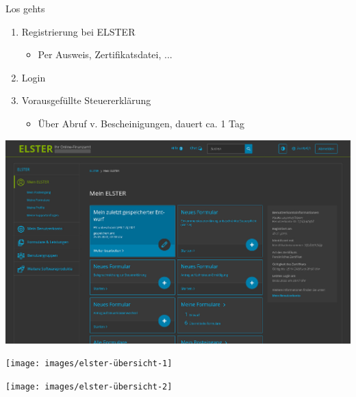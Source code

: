 \documentclass{beamer}
\begin{document}
			\begin{frame}{Los gehts}
				\begin{enumerate}
					\item Registrierung bei ELSTER
					\begin{itemize}
						\item Per Ausweis, Zertifikatsdatei, ...
					\end{itemize}\pause
					\item Login\pause
					\item Vorausgefüllte Steuererklärung
					\begin{itemize}
						\item Über Abruf v. Bescheinigungen, dauert ca. 1 Tag
					\end{itemize}
				\end{enumerate}
			\end{frame}
		
			\begin{frame}
				\begin{center}
					\vspace{-0.6cm}
					\hspace*{-0.91cm}
					\includegraphics[scale=0.24]{images/elster-1}
				\end{center}
			\end{frame}
		
			\begin{frame}
				\begin{center}
					\vspace{-0.6cm}
					\hspace*{-0.91cm}
					\texttt{[image: images/elster-übersicht-1]}
				\end{center}
			\end{frame}
		
			\begin{frame}
				\begin{center}
					\vspace{-0.6cm}
					\hspace*{-0.91cm}
					\texttt{[image: images/elster-übersicht-2]}
				\end{center}
			\end{frame}
		
\end{document}
